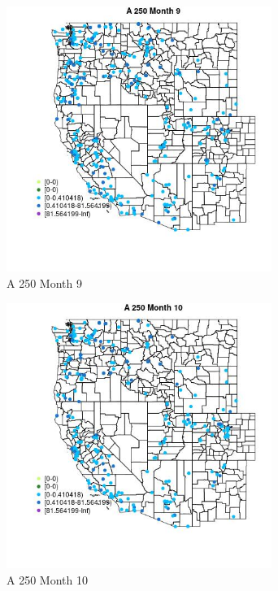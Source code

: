 \begin{figure} 
\centering  
\includegraphics[width=0.77\textwidth]{Code_Outputs/Report_ML_input_PM25_Step4_part_e_de_duplicated_aveswNAs_MapObsMo9A_250.jpg} 
\caption{\label{fig:Report_ML_input_PM25_Step4_part_e_de_duplicated_aveswNAsMapObsMo9A_250}A 250 Month 9} 
\end{figure} 
 

\begin{figure} 
\centering  
\includegraphics[width=0.77\textwidth]{Code_Outputs/Report_ML_input_PM25_Step4_part_e_de_duplicated_aveswNAs_MapObsMo10A_250.jpg} 
\caption{\label{fig:Report_ML_input_PM25_Step4_part_e_de_duplicated_aveswNAsMapObsMo10A_250}A 250 Month 10} 
\end{figure} 
 

